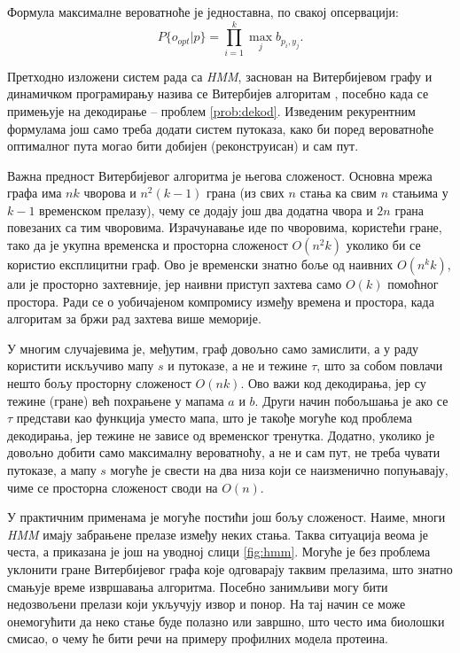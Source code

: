 \documentclass[12pt,oneside]{memoir}
\begin{document}
\begin{CJK}{UTF8}{ipxm}
Формула максималне вероватноће је једноставна, по свакој опсервацији: $$P\{o_{opt} | p\} = \prod_{i=1}^k \max_j b_{p_i, y_j}.$$

Претходно изложени систем рада са \textit{HMM}, заснован на Витербијевом графу и динамичком програмирању назива се Витербијев алгоритам \cite{ba10c}, посебно када се примењује на декодирање -- проблем \ref{prob:dekod}. Изведеним рекурентним формулама још само треба додати систем путоказа, како би поред вероватноће оптималног пута могао бити добијен (реконструисан) и сам пут.

Важна предност Витербијевог алгоритма је његова сложеност. Основна мрежа графа има $nk$ чворова и $n^2 (k-1)$ грана (из свих $n$ стања ка свим $n$ стањима у $k-1$ временском прелазу), чему се додају још два додатна чвора и $2n$ грана повезаних са тим чворовима. Израчунавање иде по чворовима, користећи гране, тако да је укупна временска и просторна сложеност $O(n^2 k)$ уколико би се користио експлицитни граф. Ово је временски знатно боље од наивних $O(n^k k)$, али је просторно захтевније, јер наивни приступ захтева само $O(k)$ помоћног простора. Ради се о уобичајеном компромису између времена и простора, када алгоритам за бржи рад захтева више меморије.

У многим случајевима је, међутим, граф довољно само замислити, а у раду користити искључиво мапу $s$ и путоказе, а не и тежине $\tau$, што за собом повлачи нешто бољу просторну сложеност $O(nk)$. Ово важи код декодирања, јер су тежине (гране) већ похрањене у мапама $a$ и $b$. Други начин побољшања је ако се $\tau$ представи као функција уместо мапа, што је такође могуће код проблема декодирања, јер тежине не зависе од временског тренутка. Додатно, уколико је довољно добити само максималну вероватноћу, а не и сам пут, не треба чувати путоказе, а мапу $s$ могуће је свести на два низа који се наизменично попуњавају, чиме се просторна сложеност своди на $O(n)$.

У практичним применама је могуће постићи још бољу сложеност. Наиме, многи \textit{HMM} имају забрањене прелазе између неких стања. Таква ситуација веома је честа, а приказана је још на уводној слици \ref{fig:hmm}. Могуће је без проблема уклонити гране Витербијевог графа које одговарају таквим прелазима, што знатно смањује време извршавања алгоритма. Посебно занимљиви могу бити недозвољени прелази који укључују извор и понор. На тај начин се може онемогућити да неко стање буде полазно или завршно, што често има биолошки смисао, о чему ће бити речи на примеру профилних модела протеина.


\end{CJK}
\end{document}
